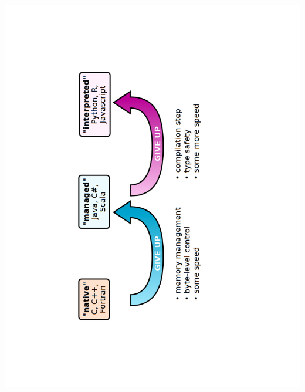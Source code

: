\documentclass[10pt, t]{beamer}
\begin{document}
\begin{frame}{} %
\begin{columns}
\includegraphics[angle=-90,width=\linewidth]{figures/languages4.pdf}
\end{columns}
\end{frame}
\end{document}
